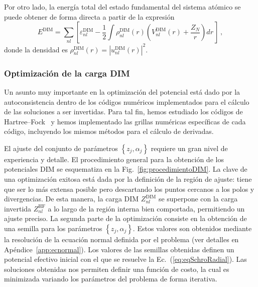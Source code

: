 Por otro lado, la energía total del estado fundamental del sistema 
atómico se puede obtener de forma directa a partir de la expresión
\begin{equation}
E^{\mathrm{DIM}} = \sum\limits_{nl} 
\left[ 
\varepsilon_{nl}^{\mathrm{DIM}} - 
\frac{1}{2}\int  \rho_{nl}^{\mathrm{DIM}}(r)
\left( V_{nl}^{\mathrm{DIM}}(r) + \frac{Z_{N}}{r}\right) dr \,
\right] \, ,
\label{Eq:Etotal}
\end{equation}
donde la densidad es 
$\rho_{nl}^{\mathrm{DIM}}(r) = |u_{nl}^{\mathrm{DIM}}(r)|^2$.

\subsubsection*{Optimización de la carga DIM}
\label{subsec:optDIM}

Un asunto muy importante en la optimización del potencial está dado por 
la autoconsistencia dentro de los códigos numéricos implementados para 
el cálculo de las soluciones a ser invertidas. Para tal fin, hemos 
estudiado los códigos de Hartree--Fock~\cite{FroeseFischer:97,
Johnson:07} y hemos implementado las grillas numéricas específicas de 
cada código, incluyendo los mismos métodos para el cálculo de derivadas. 

El ajuste del conjunto de parámetros $\left\{z_j,\alpha_j\right\}$ 
requiere un gran nivel de experiencia y detalle. El procedimiento 
general para la obtención de los potenciales DIM se esquematiza en la 
Fig.~\ref{fig:procedimientoDIM}. La clave de una optimización exitosa 
está dada por la definición de la región de ajuste: tiene que ser lo más 
extensa posible pero descartando los puntos cercanos a los polos y 
divergencias. De esta manera, la carga DIM $Z_{nl}^{\mathrm{DIM}}$ se 
superpone con la carga invertida $Z_{nl}^{\mathrm{HF}}$ a lo largo de la 
región interna bien comportada, permitiendo un ajuste preciso. La 
segunda parte de la optimización consiste en la obtención de una semilla 
para los parámetros $\left\{z_j,\alpha_j\right\}$. Estos valores son 
obtenidos mediante la resolución de la ecuación normal definida por el 
problema (ver detalles en Apéndice~\ref{app:ecnormal}). Los valores de 
las semillas obtenidas definen un potencial efectivo inicial con el que 
se resuelve la Ec.~(\ref{eq:eqSchroRadial}). Las soluciones obtenidas 
nos permiten definir una función de costo, la cual es minimizada 
variando los parámetros del problema de forma iterativa. 

